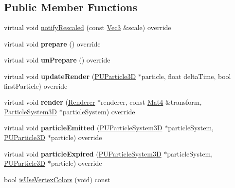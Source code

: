 \subsection*{Public Member Functions}
\begin{DoxyCompactItemize}
\item 
virtual void \hyperlink{classPURibbonTrailRender_a84442c6a329c8a1318c35655e18fdf69}{notify\+Rescaled} (const \hyperlink{classVec3}{Vec3} \&scale) override
\item 
\mbox{\label{classPURibbonTrailRender_a01929d5dff166aa400a0b10d5e6bb494}} 
virtual void {\bfseries prepare} () override
\item 
\mbox{\label{classPURibbonTrailRender_a2f5efa4a01301381f329fc5406f7330f}} 
virtual void {\bfseries un\+Prepare} () override
\item 
\mbox{\label{classPURibbonTrailRender_a78a9052c35a9d395d216d2e4c7bd4ccf}} 
virtual void {\bfseries update\+Render} (\hyperlink{structPUParticle3D}{P\+U\+Particle3D} $\ast$particle, float delta\+Time, bool first\+Particle) override
\item 
\mbox{\label{classPURibbonTrailRender_aa1566ef0d0cca88ab822b0c124aa4671}} 
virtual void {\bfseries render} (\hyperlink{classRenderer}{Renderer} $\ast$renderer, const \hyperlink{classMat4}{Mat4} \&transform, \hyperlink{classParticleSystem3D}{Particle\+System3D} $\ast$particle\+System) override
\item 
\mbox{\label{classPURibbonTrailRender_ac9ca34c50277c738ddb075ceed900903}} 
virtual void {\bfseries particle\+Emitted} (\hyperlink{classPUParticleSystem3D}{P\+U\+Particle\+System3D} $\ast$particle\+System, \hyperlink{structPUParticle3D}{P\+U\+Particle3D} $\ast$particle) override
\item 
\mbox{\label{classPURibbonTrailRender_a8d152870285b554145719bcfde00d526}} 
virtual void {\bfseries particle\+Expired} (\hyperlink{classPUParticleSystem3D}{P\+U\+Particle\+System3D} $\ast$particle\+System, \hyperlink{structPUParticle3D}{P\+U\+Particle3D} $\ast$particle) override
\item 
bool \hyperlink{classPURibbonTrailRender_abab685908ebf8ffa5a42689415647fe8}{is\+Use\+Vertex\+Colors} (void) const

\end{DoxyCompactItemize}

